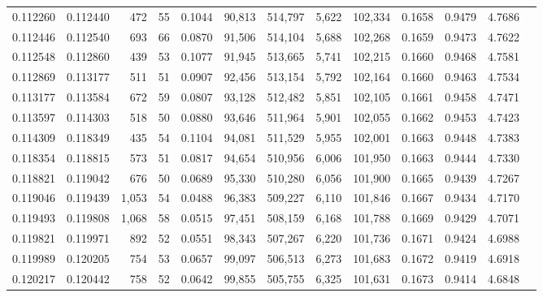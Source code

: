 \begin{tabular}{rrrrrrrrrrrrr}
0.112260 & 0.112440 &   472 &  55 &                                     0.1044 &  90,813 & 514,797 &   5,622 & 102,334 & 0.1658 & 0.9479 & 4.7686 \\
0.112446 & 0.112540 &   693 &  66 &                                     0.0870 &  91,506 & 514,104 &   5,688 & 102,268 & 0.1659 & 0.9473 & 4.7622 \\
0.112548 & 0.112860 &   439 &  53 &                                     0.1077 &  91,945 & 513,665 &   5,741 & 102,215 & 0.1660 & 0.9468 & 4.7581 \\
0.112869 & 0.113177 &   511 &  51 &                                     0.0907 &  92,456 & 513,154 &   5,792 & 102,164 & 0.1660 & 0.9463 & 4.7534 \\
0.113177 & 0.113584 &   672 &  59 &                                     0.0807 &  93,128 & 512,482 &   5,851 & 102,105 & 0.1661 & 0.9458 & 4.7471 \\
0.113597 & 0.114303 &   518 &  50 &                                     0.0880 &  93,646 & 511,964 &   5,901 & 102,055 & 0.1662 & 0.9453 & 4.7423 \\
0.114309 & 0.118349 &   435 &  54 &                                     0.1104 &  94,081 & 511,529 &   5,955 & 102,001 & 0.1663 & 0.9448 & 4.7383 \\
0.118354 & 0.118815 &   573 &  51 &                                     0.0817 &  94,654 & 510,956 &   6,006 & 101,950 & 0.1663 & 0.9444 & 4.7330 \\
0.118821 & 0.119042 &   676 &  50 &                                     0.0689 &  95,330 & 510,280 &   6,056 & 101,900 & 0.1665 & 0.9439 & 4.7267 \\
0.119046 & 0.119439 & 1,053 &  54 &                                     0.0488 &  96,383 & 509,227 &   6,110 & 101,846 & 0.1667 & 0.9434 & 4.7170 \\
0.119493 & 0.119808 & 1,068 &  58 &                                     0.0515 &  97,451 & 508,159 &   6,168 & 101,788 & 0.1669 & 0.9429 & 4.7071 \\
0.119821 & 0.119971 &   892 &  52 &                                     0.0551 &  98,343 & 507,267 &   6,220 & 101,736 & 0.1671 & 0.9424 & 4.6988 \\
0.119989 & 0.120205 &   754 &  53 &                                     0.0657 &  99,097 & 506,513 &   6,273 & 101,683 & 0.1672 & 0.9419 & 4.6918 \\
0.120217 & 0.120442 &   758 &  52 &                                     0.0642 &  99,855 & 505,755 &   6,325 & 101,631 & 0.1673 & 0.9414 & 4.6848 \\

\end{tabular}
